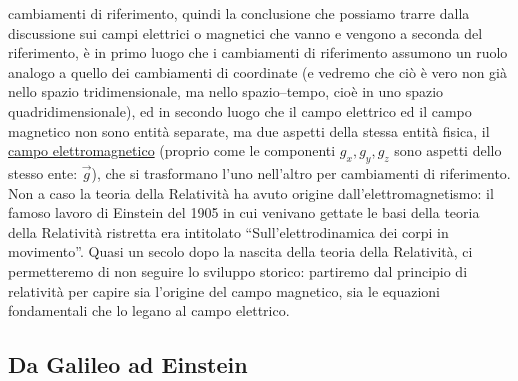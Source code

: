 cambiamenti di riferimento, quindi la conclusione che possiamo trarre dalla
discussione sui campi elettrici o magnetici che vanno e vengono a seconda del
riferimento, \`e in primo luogo che i cambiamenti di riferimento assumono un
ruolo analogo a quello dei cambiamenti di coordinate (e vedremo che ci\`o \`e
vero non gi\`a nello spazio tridimensionale, ma nello spazio--tempo, cio\`e in
uno spazio quadridimensionale), ed in secondo luogo che il campo elettrico ed il
campo magnetico non sono entit\`a separate, ma due aspetti della stessa entit\`a
fisica, il \underline{campo elettromagnetico} (proprio come le componenti
$g_x,g_y,g_z$ sono aspetti dello stesso ente: $\vec g$), che si trasformano
l'uno nell'altro per cambiamenti di riferimento.\\
Non a caso la teoria della Relativit\`a ha avuto origine dall'elettromagnetismo:
il famoso lavoro di Einstein del 1905 in cui venivano gettate le basi della
teoria della Relativit\`a ristretta era intitolato ``Sull'elettrodinamica dei
corpi in movimento''. Quasi un secolo dopo la nascita della teoria della
Relativit\`a, ci permetteremo di non seguire lo sviluppo storico: partiremo dal
principio di relativit\`a per capire sia l'origine del campo magnetico, sia le
equazioni fondamentali che lo legano al campo elettrico.

\subsection{Da Galileo ad Einstein}

